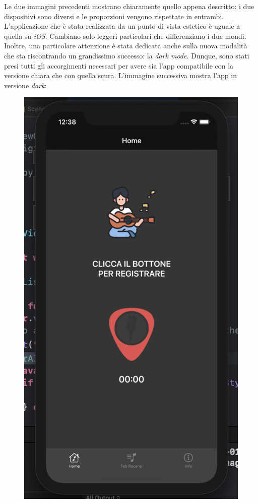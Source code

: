 \noindent Le due immagini precedenti mostrano chiaramente quello appena descritto: i due dispositivi sono diversi e le proporzioni vengono rispettate in entrambi.\\
\newline
L'applicazione che è stata realizzata da un punto di vista estetico è uguale a quella su \textit{iOS}. Cambiano solo leggeri particolari che differenziano i due mondi.\\
\newline
Inoltre, una particolare attenzione è stata dedicata anche sulla nuova modalità che sta riscontrando un grandissimo successo: la \textit{dark mode}. Dunque, sono stati presi tutti gli accorgimenti necessari per avere sia l'app compatibile con la versione chiara che con quella scura. L'immagine successiva mostra l'app in versione \textit{dark}:
\begin{figure}[H]
	\centering
	\includegraphics[scale=0.20]{./images/img10.png}
\end{figure}


